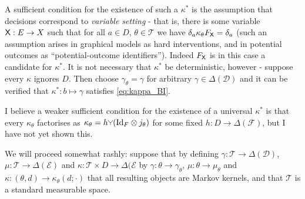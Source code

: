 A sufficient condition for the existence of such a $\kappa^*$ is the assumption that decisions correspond to \emph{variable setting} - that is, there is some variable $\mathsf{X}:E\to X$ such that for all $a\in D$, $\theta\in\mathscr{T}$ we have $\delta_a \kappa_\theta F_{\mathsf{X}} = \delta_a$ (such an assumption arises in graphical models as hard interventions, and in potential outcomes as ``potential-outcome identifiers''). Indeed $F_{\mathsf{X}}$ is in this case a candidate for $\kappa^*$. It is not necessary that $\kappa^*$ be deterministic, however - suppose every $\kappa$ ignores $D$. Then choose $\gamma_\theta=\gamma$ for arbitrary $\gamma\in \Delta(\mathcal{D})$ and it can be verified that $\kappa^*:b\mapsto \gamma$ satisfies \ref{eq:kappa_BI}. 

I believe a weaker sufficient condition for the existence of a universal $\kappa^*$ is that every $\kappa_\theta$ factorises as $\kappa_\theta = h \splitter{0.1}(\mathrm{Id}_F\otimes j_\theta)$ for some fixed $h:D\to \Delta(\mathcal{F})$, but I have not yet shown this.

We will proceed somewhat rashly: suppose that by defining $\gamma:\mathscr{T}\to \Delta(\mathcal{D})$, $\mu:\mathscr{T}\to \Delta(\mathcal{E})$ and $\kappa:\mathscr{T}\times D\to \Delta(\mathcal{E}$ by $\gamma:\theta\to \gamma_\theta$, $\mu:\theta\to \mu_\theta$ and $\kappa:(\theta,d)\to \kappa_\theta(d;\cdot)$ that all resulting objects are Markov kernels, and that $\mathscr{T}$ is a standard measurable space.

